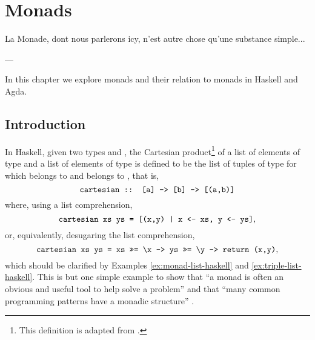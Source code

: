 \chapter{Monads}
\label{chap:monads}

\epigraph{
  La Monade, dont nous parlerons icy, n'est autre chose qu'une
  substance simple...
}{---\textcite[1]{leibniz-1714}}

In this chapter we explore monads and their relation to monads in
Haskell and Agda.

\section{Introduction}
\label{sec:monads-introduction}


In Haskell, given two types  and , the
Cartesian product\footnote{This definition is adapted from
  \parencite{weisstein-cartesian}.} of a list  of
elements of type  and a list  of
elements of type  is defined to be the list of tuples
 of type  for which
 belongs to  and 
belongs to , that is,
\begin{equation*}
  \text{\texttt{cartesian :: [a] -> [b] -> [(a,b)]}}
\end{equation*}
where, using a list comprehension,
\begin{equation*}
  \text{\texttt{cartesian xs ys = [(x,y) | x <- xs, y <- ys]}}
  \text{,}
\end{equation*}
or, equivalently, desugaring the list comprehension,
\begin{equation*}
  \text{\texttt{cartesian xs ys = xs >>= \textbackslash x -> ys >>= \textbackslash y -> return (x,y)}}
  \text{,}
\end{equation*}
which should be clarified by Examples \ref{ex:monad-list-haskell} and
\ref{ex:triple-list-haskell}. This is but one simple example to show
that ``a monad is often an obvious and useful tool to help solve a
problem'' \parencite[325]{osullivan-2008} and that ``many common
programming patterns have a monadic structure''
\parencite[328]{osullivan-2008}.


